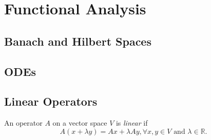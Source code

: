 \documentclass[a4paper]{book}
\def\R{\mathbb{R}}
\begin{document}
\part{Functional Analysis}
\chapter{Banach and Hilbert Spaces}
\chapter{ODEs}
\chapter{Linear Operators}
\begin{myDef}[Linear]
    An operator $A$ on a vector space $V$ is \emph{linear} if
    \[
        A(x+\lambda y)=Ax+\lambda Ay, \forall x, y \in V \text{ and } \lambda \in \R.
    \]
\end{myDef}
\end{document}
